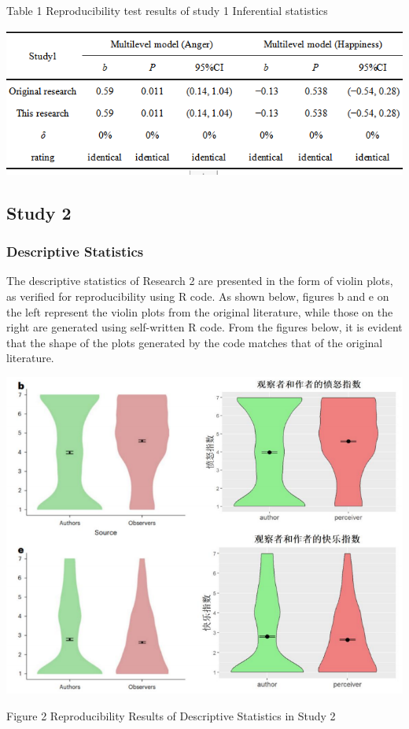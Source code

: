 \documentclass[
  man]{apa6}
\begin{document}
\begin{center}
Table 1 Reproducibility test results of study 1 Inferential statistics
\end{center}
\begin{center}
\includegraphics{study1_Reproducibility_Plot.png}
\end{center}

\hypertarget{study-2}{%
\subsection{Study 2}\label{study-2}}

\hypertarget{descriptive-statistics-1}{%
\subsubsection{Descriptive Statistics}\label{descriptive-statistics-1}}

The descriptive statistics of Research 2 are presented in the form of violin plots, as verified for reproducibility using R code. As shown below, figures b and e on the left represent the violin plots from the original literature, while those on the right are generated using self-written R code. From the figures below, it is evident that the shape of the plots generated by the code matches that of the original literature.

\begin{center}
\includegraphics{study2_Violin_Plot.png}
\end{center}
\begin{center}
Figure 2 Reproducibility Results of Descriptive Statistics in Study 2
\end{center}
\end{document}
